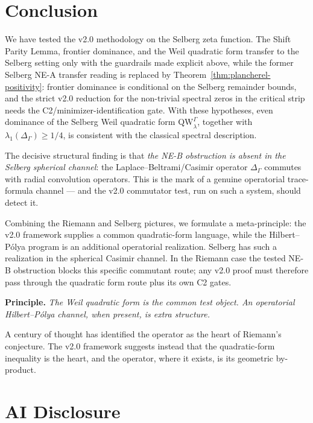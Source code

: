 \documentclass[12pt,a4paper]{article}
\theoremstyle{definition}
\theoremstyle{remark}
\newcommand{\QW}{\mathrm{QW}}
\newcommand{\Delop}{\Delta_{\Gamma}}
\begin{document}
\section{Conclusion}
\label{sec:conclusion}

We have tested the v2.0 methodology on the Selberg zeta function. The
Shift Parity Lemma, frontier dominance, and the Weil quadratic form transfer
to the Selberg setting only with the guardrails made explicit above, while the
former Selberg NE-A transfer reading is replaced by
Theorem~\ref{thm:plancherel-positivity}: frontier dominance is conditional on
the Selberg remainder bounds, and the
strict v2.0 reduction for the non-trivial spectral zeros in the critical strip
needs the C2/minimizer-identification gate. With these hypotheses, even
dominance of the Selberg Weil quadratic form $\QW^\Gamma_\lambda$, together
with $\lambda_1(\Delop)\ge 1/4$, is
consistent with the classical spectral description.

The decisive structural finding is that \emph{the NE-B obstruction is absent
in the Selberg spherical channel}: the Laplace--Beltrami/Casimir operator
$\Delop$ commutes with radial convolution operators. This is the mark of a
genuine operatorial trace-formula channel --- and the v2.0 commutator test,
run on such a system, should detect it.

Combining the Riemann and Selberg pictures, we formulate a meta-principle:
the v2.0 framework supplies a common quadratic-form language, while the
Hilbert--Pólya program is an additional operatorial realization. Selberg
has such a realization in the spherical Casimir channel. In the Riemann case
the tested NE-B obstruction blocks this specific commutant route; any v2.0
proof must therefore pass through the quadratic form route plus its own C2
gates.

\medskip
\noindent\textbf{Principle.} \emph{The Weil quadratic form is the common
test object. An operatorial Hilbert--Pólya channel, when present, is extra
structure.}

\medskip
A century of thought has identified the operator as the heart of
Riemann's conjecture. The v2.0 framework suggests instead that the
quadratic-form inequality is the heart, and the operator, where it
exists, is its geometric by-product.


\section*{AI Disclosure}
\end{document}
